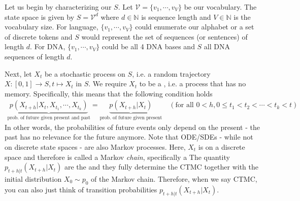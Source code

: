 Let us begin by characterizing our  $S$. Let $\mathcal{V}=\{v_{1},\cdots,v_{V}\}$ be our vocabulary. The state space is given by $S=\mathcal{V}^d$ where $d\in \mathbb{N}$ is sequence length and $V\in \mathbb{N}$ is the vocabulary size. For language, $\{v_{1},\cdots,v_{V}\}$ could enumerate our alphabet or a set of discrete tokens and $S$ would represent the set of sequences (or sentences) of length $d$. For DNA, $\{v_{1},\cdots,v_{V}\}$ could be all 4 DNA bases and $S$ all DNA sequences of length $d$.

Next, let $X_t$ be a stochastic process on $S$, i.e. a random trajectory $X:[0,1]\to S, t\mapsto X_{t}$ in $S$. We require $X_t$ to be a , i.e. a process that has no memory. Specifically, this means that the following condition holds
\begin{align*}
\underbrace{p(X_{t+h}|X_{t}, X_{t_1},\cdots, X_{t_k})}_{\text{prob. of future given present and past}}=\underbrace{p(X_{t+h}|X_{t})}_{\text{prob. of future given present}}\quad (\text{for all }0<h, 0\leq t_1<t_2<\cdots <t_k<t)
\end{align*}
In other words, the probabilities of future events only depend on the present - the past has no relevance for the future anymore. Note that ODE/SDEs - while not on discrete state spaces - are also Markov processes. Here, $X_t$ is on a discrete space and therefore is called a Markov \emph{chain}, specifically a  The quantity $p_{t+h|t}(X_{t+h}|X_{t})$ are the  and they fully determine the CTMC together with the initial distribution $X_0\sim p_0$ of the Markov chain. Therefore, when we say CTMC, you can also just think of transition probabilities $p_{t+h|t}(X_{t+h}|X_{t})$.

